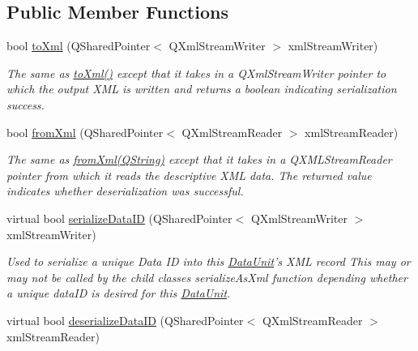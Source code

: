 \subsection*{Public Member Functions}
\begin{DoxyCompactItemize}
\item 
\hypertarget{class_picto_1_1_data_unit_a646b9a82da9655fdec9d81efed210377}{bool \hyperlink{class_picto_1_1_data_unit_a646b9a82da9655fdec9d81efed210377}{to\-Xml} (Q\-Shared\-Pointer$<$ Q\-Xml\-Stream\-Writer $>$ xml\-Stream\-Writer)}\label{class_picto_1_1_data_unit_a646b9a82da9655fdec9d81efed210377}

\begin{DoxyCompactList}\small\item\em The same as \hyperlink{class_picto_1_1_serializable_a2715cc957dfee3198e54643f546eba26}{to\-Xml()} except that it takes in a Q\-Xml\-Stream\-Writer pointer to which the output X\-M\-L is written and returns a boolean indicating serialization success. \end{DoxyCompactList}\item 
\hypertarget{class_picto_1_1_data_unit_af34efeef5d9719dade28b10b0cf5509e}{bool \hyperlink{class_picto_1_1_data_unit_af34efeef5d9719dade28b10b0cf5509e}{from\-Xml} (Q\-Shared\-Pointer$<$ Q\-Xml\-Stream\-Reader $>$ xml\-Stream\-Reader)}\label{class_picto_1_1_data_unit_af34efeef5d9719dade28b10b0cf5509e}

\begin{DoxyCompactList}\small\item\em The same as \hyperlink{class_picto_1_1_serializable_acbaf02a158b3440a16bc1a84ebaa4481}{from\-Xml(\-Q\-String)} except that it takes in a Q\-X\-M\-L\-Stream\-Reader pointer from which it reads the descriptive X\-M\-L data. The returned value indicates whether deserialization was successful. \end{DoxyCompactList}\item 
\hypertarget{class_picto_1_1_data_unit_abcb515268464ede0f0b10e14480870f1}{virtual bool \hyperlink{class_picto_1_1_data_unit_abcb515268464ede0f0b10e14480870f1}{serialize\-Data\-I\-D} (Q\-Shared\-Pointer$<$ Q\-Xml\-Stream\-Writer $>$ xml\-Stream\-Writer)}\label{class_picto_1_1_data_unit_abcb515268464ede0f0b10e14480870f1}

\begin{DoxyCompactList}\small\item\em Used to serialize a unique Data I\-D into this \hyperlink{class_picto_1_1_data_unit}{Data\-Unit}'s X\-M\-L record This may or may not be called by the child classes serialize\-As\-Xml function depending whether a unique data\-I\-D is desired for this \hyperlink{class_picto_1_1_data_unit}{Data\-Unit}. \end{DoxyCompactList}\item 
\hypertarget{class_picto_1_1_data_unit_aaef73d52ee96ae4800e6b1bfbbcf4b5a}{virtual bool \hyperlink{class_picto_1_1_data_unit_aaef73d52ee96ae4800e6b1bfbbcf4b5a}{deserialize\-Data\-I\-D} (Q\-Shared\-Pointer$<$ Q\-Xml\-Stream\-Reader $>$ xml\-Stream\-Reader)}\label{class_picto_1_1_data_unit_aaef73d52ee96ae4800e6b1bfbbcf4b5a}


\end{DoxyCompactItemize}
